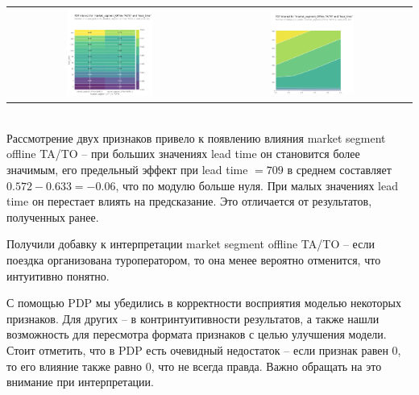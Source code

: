 \begin{tabular}{c|c}
	\arrayrulecolor[rgb]{0.8,0.85,1}
	\includegraphics*[width = 0.44\textwidth]{pics/mypdp9.png} & \includegraphics*[width = 0.44\textwidth]{pics/mypdp10.png}\\
\end{tabular}\\[1mm]

Рассмотрение двух признаков привело к появлению влияния market segment offline TA/TO -- при больших значениях lead time он становится более значимым, его предельный эффект при lead time $=709$ в среднем составляет $0.572-0.633=-0.06$, что по модулю больше нуля. При малых значениях lead time он перестает влиять на предсказание. Это отличается от результатов, полученных ранее.

Получили добавку к интерпретации market segment offline TA/TO -- если поездка организована туроператором, то она менее вероятно отменится, что интуитивно понятно.

С помощью PDP мы убедились в корректности восприятия моделью некоторых признаков. Для других -- в контринтуитивности результатов, а также нашли возможность для пересмотра формата признаков с целью улучшения модели. Стоит отметить, что в PDP есть очевидный недостаток -- если признак равен 0, то его влияние также равно 0, что не всегда правда. Важно обращать на это внимание при интерпретации.

